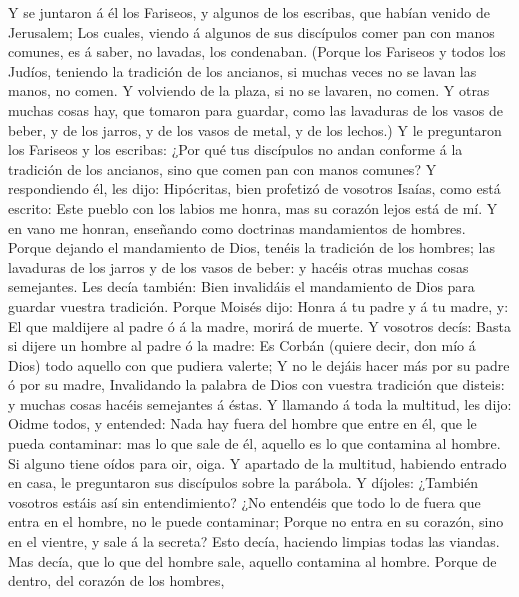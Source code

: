  Y se juntaron á él los Fariseos, y algunos de los escribas,
que habían venido de Jerusalem;  Los cuales, viendo á
algunos de sus discípulos comer pan con manos comunes, es á saber, no
lavadas, los condenaban.  (Porque los Fariseos y todos los
Judíos, teniendo la tradición de los ancianos, si muchas veces no se
lavan las manos, no comen.  Y volviendo de la plaza, si no
se lavaren, no comen. Y otras muchas cosas hay, que tomaron para
guardar, como las lavaduras de los vasos de beber, y de los jarros, y de
los vasos de metal, y de los lechos.)  Y le preguntaron los
Fariseos y los escribas: ¿Por qué tus discípulos no andan conforme á la
tradición de los ancianos, sino que comen pan con manos comunes?
 Y respondiendo él, les dijo: Hipócritas, bien profetizó de
vosotros Isaías, como está escrito: Este pueblo con los labios me honra,
mas su corazón lejos está de mí.  Y en vano me honran,
enseñando como doctrinas mandamientos de hombres.  Porque
dejando el mandamiento de Dios, tenéis la tradición de los hombres; las
lavaduras de los jarros y de los vasos de beber: y hacéis otras muchas
cosas semejantes.  Les decía también: Bien invalidáis el
mandamiento de Dios para guardar vuestra tradición.  Porque
Moisés dijo: Honra á tu padre y á tu madre, y: El que maldijere al padre
ó á la madre, morirá de muerte.  Y vosotros decís: Basta si
dijere un hombre al padre ó la madre: Es Corbán (quiere decir, don mío á
Dios) todo aquello con que pudiera valerte;  Y no le dejáis
hacer más por su padre ó por su madre,  Invalidando la
palabra de Dios con vuestra tradición que disteis: y muchas cosas hacéis
semejantes á éstas.  Y llamando á toda la multitud, les
dijo: Oidme todos, y entended:  Nada hay fuera del hombre
que entre en él, que le pueda contaminar: mas lo que sale de él, aquello
es lo que contamina al hombre.  Si alguno tiene oídos para
oir, oiga.  Y apartado de la multitud, habiendo entrado en
casa, le preguntaron sus discípulos sobre la parábola.  Y
díjoles: ¿También vosotros estáis así sin entendimiento? ¿No entendéis
que todo lo de fuera que entra en el hombre, no le puede contaminar;
 Porque no entra en su corazón, sino en el vientre, y sale
á la secreta? Esto decía, haciendo limpias todas las viandas.
 Mas decía, que lo que del hombre sale, aquello contamina
al hombre.  Porque de dentro, del corazón de los hombres,
